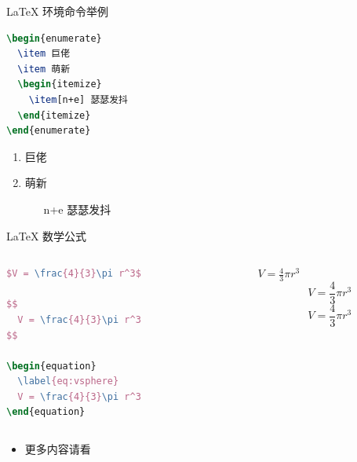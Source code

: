 \documentclass[aspectratio=169]{beamer}
\begin{document}
\begin{frame}[fragile]{\LaTeX{} 环境命令举例}
    \begin{minipage}{0.5\linewidth}
\begin{lstlisting}[language=TeX]
\begin{enumerate}
  \item 巨佬
  \item 萌新
  \begin{itemize}
    \item[n+e] 瑟瑟发抖
  \end{itemize}
\end{enumerate}
\end{lstlisting}
    \end{minipage}\hspace{1cm}
    \begin{minipage}{0.3\linewidth}
        \begin{enumerate}
            \item 巨佬
            \item 萌新
            \begin{itemize}
                \item[n+e] 瑟瑟发抖
            \end{itemize}
        \end{enumerate}
    \end{minipage}
\end{frame}

\begin{frame}[fragile]{\LaTeX{} 数学公式}
    \begin{columns}
        \begin{column}{.55\textwidth}
\begin{lstlisting}[language=TeX]
$V = \frac{4}{3}\pi r^3$

$$
  V = \frac{4}{3}\pi r^3
$$

\begin{equation}
  \label{eq:vsphere}
  V = \frac{4}{3}\pi r^3
\end{equation}
\end{lstlisting}
        \end{column}
        \begin{column}{.4\textwidth}
            $V = \frac{4}{3}\pi r^3$
            $$
                V = \frac{4}{3}\pi r^3
            $$
            \begin{equation}
                \label{eq:vsphere}
                V = \frac{4}{3}\pi r^3
            \end{equation}
        \end{column}
    \end{columns}
    \begin{itemize}
        \item 更多内容请看 \href{https://zh.wikipedia.org/wiki/Help:数学公式}{\color{purple}{这里}}
    \end{itemize}
\end{frame}
\end{document}

